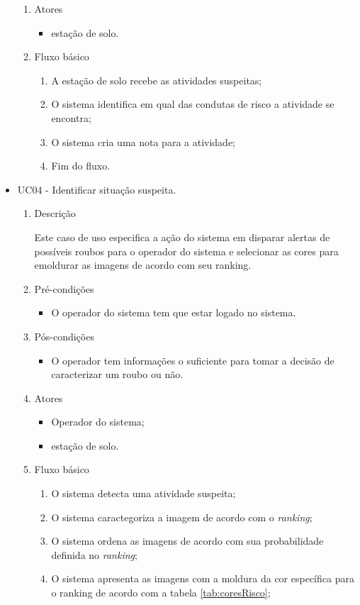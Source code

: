 \begin{itemize}
\begin{enumerate}
					\item Atores
						\begin{itemize}
							\item estação de solo.
						\end{itemize}


					\item Fluxo básico
						\begin{enumerate}
							\item A estação de solo recebe as atividades suspeitas;
							\item O sistema identifica em qual das condutas de risco a atividade se encontra;
							\item O sistema cria uma nota para a atividade;
							\item Fim do fluxo.

						\end{enumerate}
				\end{enumerate}

		\item UC04 - Identificar situação suspeita.
			\begin{enumerate}
				\item Descrição

					Este caso de uso especifica a ação do sistema em disparar alertas de possíveis roubos para o operador do sistema e selecionar as cores para emoldurar as imagens de acordo com seu ranking.

				\item Pré-condições
					\begin{itemize}
						\item O operador do sistema tem que estar logado no sistema.
					\end{itemize}

				\item Pós-condições
					\begin{itemize}
						\item O operador tem informações o suficiente para tomar a decisão de caracterizar um roubo ou não.
					\end{itemize}

				\item Atores
					\begin{itemize}
						\item Operador do sistema;
						\item estação de solo.
					\end{itemize}


				\item Fluxo básico
					\begin{enumerate}
						\item O sistema detecta uma atividade suspeita;
						\item O sistema caractegoriza a imagem de acordo com o \textit{ranking};
						\label{item:imagemAcordoRanking}
						\item O sistema ordena as imagens de acordo com sua probabilidade definida no \textit{ranking};
						\item O sistema apresenta as imagens com a moldura da cor específica para o ranking de acordo com a tabela \ref{tab:coresRisco};


\end{enumerate}
\end{enumerate}
\end{itemize}
